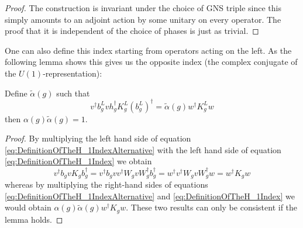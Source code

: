 \begin{proof}
	The construction is invariant under the choice of GNS triple since this simply amounts to an adjoint action by some unitary on every operator. The proof that it is independent of the choice of phases is just as trivial.
\end{proof}
One can also define this index starting from operators acting on the left. As the following lemma shows this gives us the opposite index (the complex conjugate of the $U(1)$-representation):
\begin{lemma}
	Define $\tilde{\alpha}(g)$ such that
	\begin{equation}\label{eq:DefinitionOfTheH_1IndexAlternative}
		v^\dagger b_g^L v h_g^\dagger K_g^L (b_g^L)^\dagger=\tilde{\alpha}(g)w^\dagger K_g^L w
	\end{equation}
	then $\alpha(g)\tilde{\alpha}(g)=1$.
\end{lemma}
\begin{proof}
	By multiplying the left hand side of equation \eqref{eq:DefinitionOfTheH_1IndexAlternative} with the left hand side of equation \eqref{eq:DefinitionOfTheH_1Index} we obtain
	\begin{equation}
		v^\dagger b_g v K_g b_g^\dagger=v^\dagger b_g v v^\dagger W_g v W_g^\dagger b_g^\dagger=w^\dagger v^\dagger W_g v W_g^\dagger w=w^\dagger K_g w
	\end{equation}
	whereas by multiplying the right-hand sides of equations \eqref{eq:DefinitionOfTheH_1IndexAlternative} and \eqref{eq:DefinitionOfTheH_1Index} we would obtain $\alpha(g)\tilde{\alpha}(g)w^\dagger K_g w$. These two results can only be consistent if the lemma holds.
\end{proof}
